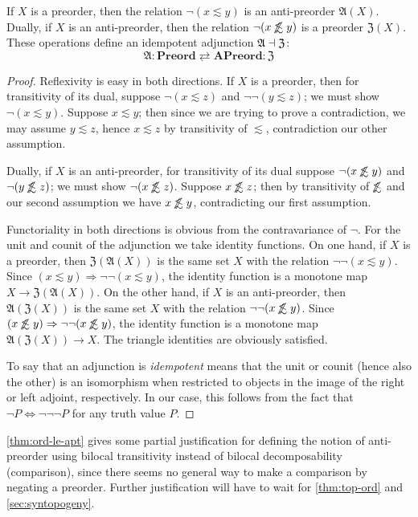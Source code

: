 \documentclass{article}
\def\oapt{\mathrel{\!\not\,\not\lesssim}}
\def\leapx{\lesssim}
\let\implies\Rightarrow
\def\anti{\mathfrak{A}}
\def\neigh{\mathfrak{Z}}
\def\Preord{\mathbf{Preord}}
\def\APreord{\mathbf{APreord}}
\begin{document}
\begin{thm}\label{thm:ord-le-apt}
  If $X$ is a preorder, then the relation $\neg(x\leapx y)$ is an anti-preorder $\anti(X)$.
  Dually, if $X$ is an anti-preorder, then the relation $\neg(x\oapt y)$ is a preorder $\neigh(X)$.
  These operations define an idempotent adjunction $\anti\adj\neigh$:
  \[\anti : \Preord \rightleftarrows \APreord : \neigh\]
\end{thm}
\begin{proof}
  Reflexivity is easy in both directions.
  If $X$ is a preorder, then for transitivity of its dual, suppose $\neg(x\leapx z)$ and $\neg\neg(y\leapx z)$; we must show $\neg(x\leapx y)$.
  Suppose $x\leapx y$; then since we are trying to prove a contradiction, we may assume $y\leapx z$, hence $x\leapx z$ by transitivity of $\leapx$, contradiction our other assumption.

  Dually, if $X$ is an anti-preorder, for transitivity of its dual suppose $\neg (x\oapt y)$ and $\neg (y\oapt z)$; we must show $\neg(x\oapt z)$.
  Suppose $x\oapt z$; then by transitivity of $\oapt$ and our second assumption we have $x\oapt y$, contradicting our first assumption.

  Functoriality in both directions is obvious from the contravariance of $\neg$.
  For the unit and counit of the adjunction we take identity functions.
  On one hand, if $X$ is a preorder, then $\neigh(\anti(X))$ is the same set $X$ with the relation $\neg\neg(x\leapx y)$.
  Since $(x\leapx y) \implies \neg\neg(x\leapx y)$, the identity function is a monotone map $X\to \neigh(\anti(X))$.
  On the other hand, if $X$ is an anti-preorder, then $\anti(\neigh(X))$ is the same set $X$ with the relation $\neg\neg(x\oapt y)$.
  Since $(x\oapt y) \implies \neg\neg(x\oapt y)$, the identity function is a monotone map $\anti(\neigh(X)) \to X$.
  The triangle identities are obviously satisfied.

  To say that an adjunction is \emph{idempotent} means that the unit or counit (hence also the other) is an isomorphism when restricted to objects in the image of the right or left adjoint, respectively.
  In our case, this follows from the fact that $\neg P \iff \neg\neg\neg P$ for any truth value $P$.
\end{proof}

\cref{thm:ord-le-apt} gives some partial justification for defining the notion of anti-preorder using bilocal transitivity instead of bilocal decomposability (comparison), since there seems no general way to make a comparison by negating a preorder.
Further justification will have to wait for \cref{thm:top-ord} and \cref{sec:syntopogeny}.
\end{document}
